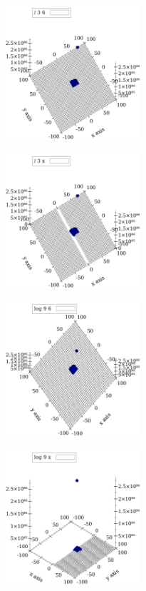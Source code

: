 \documentclass[10pt,a4paper]{article}
\begin{document}
\begin{center}
\begin{center}
\end{center}
\begin{center}
\includegraphics[width=5cm, height=5cm]{9}
\end{center}
\begin{center}
\includegraphics[width=5cm, height=5cm]{8}
\end{center}
\begin{center}
\includegraphics[width=5cm, height=5cm]{7}
\end{center}
\begin{center}
\includegraphics[width=5cm, height=5cm]{6}

\end{center}
\end{center}
\end{document}
